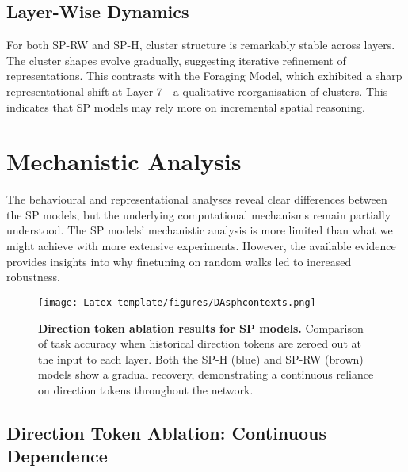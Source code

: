 \subsection{Layer-Wise Dynamics}

For both SP-RW and SP-H, cluster structure is remarkably stable across layers. The cluster shapes evolve gradually, suggesting iterative refinement of representations. This contrasts with the Foraging Model, which exhibited a sharp representational shift at Layer 7—a qualitative reorganisation of clusters. This indicates that SP models may rely more on incremental spatial reasoning.


\section{Mechanistic Analysis}

The behavioural and representational analyses reveal clear differences between the SP models, but the underlying computational mechanisms remain partially understood. The SP models' mechanistic analysis is more limited than what we might achieve with more extensive experiments. However, the available evidence provides insights into why finetuning on random walks led to increased robustness.

\begin{figure}[h]
\centering
\texttt{[image: Latex template/figures/DAsphcontexts.png]}
\caption[Direction token ablation results for SP models.]{\textbf{Direction token ablation results for SP models.} Comparison of task accuracy when historical direction tokens are zeroed out at the input to each layer. Both the SP-H (blue) and SP-RW (brown) models show a gradual recovery, demonstrating a continuous reliance on direction tokens throughout the network.}
\label{fig:sp_direction_ablation}
\end{figure}
\subsection{Direction Token Ablation: Continuous Dependence}

